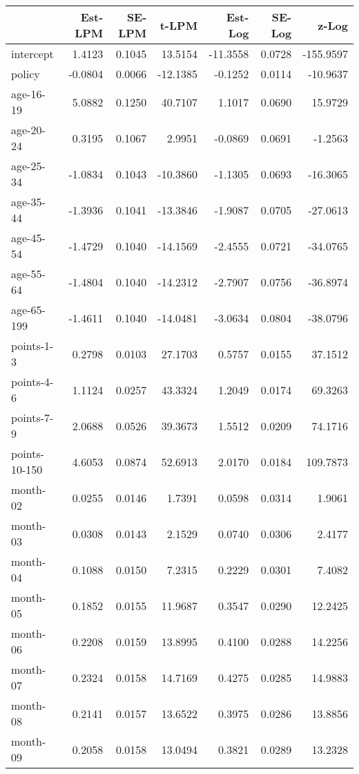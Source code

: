 \documentclass[10pt]{article}
\begin{document}
\begin{table}[ht]
\centering
\begin{tabular}{lrrrrrr}
  \hline
 & Est-LPM & SE-LPM & t-LPM & Est-Log & SE-Log & z-Log \\ 
  \hline
intercept & 1.4123 & 0.1045 & 13.5154 & -11.3558 & 0.0728 & -155.9597 \\ 
  policy & -0.0804 & 0.0066 & -12.1385 & -0.1252 & 0.0114 & -10.9637 \\ 
  age-16-19 & 5.0882 & 0.1250 & 40.7107 & 1.1017 & 0.0690 & 15.9729 \\ 
  age-20-24 & 0.3195 & 0.1067 & 2.9951 & -0.0869 & 0.0691 & -1.2563 \\ 
  age-25-34 & -1.0834 & 0.1043 & -10.3860 & -1.1305 & 0.0693 & -16.3065 \\ 
  age-35-44 & -1.3936 & 0.1041 & -13.3846 & -1.9087 & 0.0705 & -27.0613 \\ 
  age-45-54 & -1.4729 & 0.1040 & -14.1569 & -2.4555 & 0.0721 & -34.0765 \\ 
  age-55-64 & -1.4804 & 0.1040 & -14.2312 & -2.7907 & 0.0756 & -36.8974 \\ 
  age-65-199 & -1.4611 & 0.1040 & -14.0481 & -3.0634 & 0.0804 & -38.0796 \\ 
  points-1-3 & 0.2798 & 0.0103 & 27.1703 & 0.5757 & 0.0155 & 37.1512 \\ 
  points-4-6 & 1.1124 & 0.0257 & 43.3324 & 1.2049 & 0.0174 & 69.3263 \\ 
  points-7-9 & 2.0688 & 0.0526 & 39.3673 & 1.5512 & 0.0209 & 74.1716 \\ 
  points-10-150 & 4.6053 & 0.0874 & 52.6913 & 2.0170 & 0.0184 & 109.7873 \\ 
  month-02 & 0.0255 & 0.0146 & 1.7391 & 0.0598 & 0.0314 & 1.9061 \\ 
  month-03 & 0.0308 & 0.0143 & 2.1529 & 0.0740 & 0.0306 & 2.4177 \\ 
  month-04 & 0.1088 & 0.0150 & 7.2315 & 0.2229 & 0.0301 & 7.4082 \\ 
  month-05 & 0.1852 & 0.0155 & 11.9687 & 0.3547 & 0.0290 & 12.2425 \\ 
  month-06 & 0.2208 & 0.0159 & 13.8995 & 0.4100 & 0.0288 & 14.2256 \\ 
  month-07 & 0.2324 & 0.0158 & 14.7169 & 0.4275 & 0.0285 & 14.9883 \\ 
  month-08 & 0.2141 & 0.0157 & 13.6522 & 0.3975 & 0.0286 & 13.8856 \\ 
  month-09 & 0.2058 & 0.0158 & 13.0494 & 0.3821 & 0.0289 & 13.2328 \\ 

\end{tabular}
\end{table}
\end{document}
